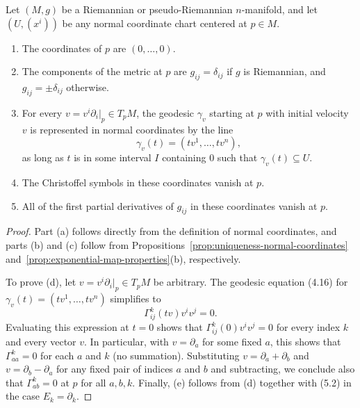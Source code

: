 \begin{proposition}
\label{prop:properties-normal-coordinates}

Let $(M,g)$ be a Riemannian or pseudo-Riemannian $n$-manifold, and let $(U,(x^i))$ be any normal coordinate chart centered at $p \in M$.
\begin{enumerate}
\item[(a)] The coordinates of $p$ are $(0,\ldots,0)$.
\item[(b)] The components of the metric at $p$ are $g_{ij} = \delta_{ij}$ if $g$ is Riemannian, and $g_{ij} = \pm\delta_{ij}$ otherwise.
\item[(c)] For every $v = v^i \partial_i|_p \in T_p M$, the geodesic $\gamma_v$ starting at $p$ with initial velocity $v$ is represented in normal coordinates by the line
\begin{equation}
\gamma_v(t) = (tv^1,\ldots,tv^n), \tag{5.20}
\end{equation}
as long as $t$ is in some interval $I$ containing $0$ such that $\gamma_v(t) \subseteq U$.
\item[(d)] The Christoffel symbols in these coordinates vanish at $p$.
\item[(e)] All of the first partial derivatives of $g_{ij}$ in these coordinates vanish at $p$.
\end{enumerate}

\begin{proof}
Part (a) follows directly from the definition of normal coordinates, and parts (b) and (c) follow from Propositions~\ref{prop:uniqueness-normal-coordinates} and~\ref{prop:exponential-map-properties}(b), respectively.

To prove (d), let $v = v^i \partial_i|_p \in T_p M$ be arbitrary. The geodesic equation (4.16) for $\gamma_v(t) = (tv^1, \ldots, tv^n)$ simplifies to
\[
\Gamma_{ij}^k(tv) v^i v^j = 0.
\]
Evaluating this expression at $t = 0$ shows that $\Gamma_{ij}^k(0) v^i v^j = 0$ for every index $k$ and every vector $v$. In particular, with $v = \partial_a$ for some fixed $a$, this shows that $\Gamma_{aa}^k = 0$ for each $a$ and $k$ (no summation). Substituting $v = \partial_a + \partial_b$ and $v = \partial_b - \partial_a$ for any fixed pair of indices $a$ and $b$ and subtracting, we conclude also that $\Gamma_{ab}^k = 0$ at $p$ for all $a, b, k$. Finally, (e) follows from (d) together with (5.2) in the case $E_k = \partial_k$.
\end{proof}
\end{proposition}

